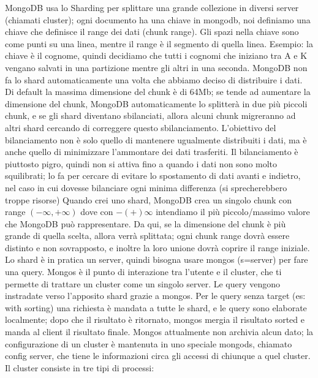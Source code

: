 \documentclass[a4page, 11pt]{article}
\begin{document}
MongoDB usa lo Sharding per splittare una grande collezione in diversi server (chiamati cluster); ogni documento ha una chiave in mongodb, noi definiamo una chiave che definisce il range dei dati (chunk range).
Gli spazi nella chiave sono come punti su una linea, mentre il range è il segmento di quella linea.
Esempio: la chiave è il cognome, quindi decidiamo che tutti i cognomi che iniziano tra A e K vengano salvati in una partizione mentre gli altri in una seconda.
MongoDB non fa lo shard automaticamente una volta che abbiamo deciso di distribuire i dati. 
Di default la massima dimensione del chunk è di 64Mb; se tende ad aumentare la dimensione del chunk, MongoDB automaticamente lo splitterà in due più piccoli chunk, e se gli shard diventano sbilanciati, allora alcuni chunk migreranno ad altri shard cercando di correggere questo sbilanciamento. 
L'obiettivo del bilanciamento non è solo quello di mantenere ugualmente distribuiti i dati, ma è anche quello di minimizzare l'ammontare dei dati trasferiti. 
Il bilanciamento è piuttosto pigro, quindi non si attiva fino a quando i dati non sono molto squilibrati; lo fa per cercare di
evitare lo spostamento di dati avanti e indietro, nel caso in cui dovesse bilanciare ogni minima differenza (si sprecherebbero troppe risorse)
\newline
Quando crei uno shard, MongoDB crea un singolo chunk con range $(-\infty, +\infty)$ dove con $-(+)\infty$ intendiamo il più piccolo/massimo valore che MongoDB può rappresentare. 
Da qui, se la dimensione del chunk è più grande di quella scelta, allora verrà splittata; ogni chunk range dovrà essere distinto e non sovrapposto, e inoltre la loro unione dovrà coprire il range iniziale.
\newline
Lo shard è in pratica un server, quindi bisogna usare mongos (s=server) per fare una query. Mongos è il punto di interazione tra l'utente e il cluster, che ti permette di trattare un cluster come un singolo server.
Le query vengono instradate verso l'apposito shard grazie a mongos. Per le query senza target (es: with sorting) una richiesta è mandata a tutte le shard, e le query sono elaborate localmente; dopo che il risultato è ritornato, mongos mergia il risultato sorted e manda al client il risultato finale.
Mongos attualmente non archivia alcun dato; la configurazione di un cluster è mantenuta in uno speciale mongods, chiamato config server, che tiene le informazioni circa gli accessi di chiunque a quel cluster.
\newline
Il cluster consiste in tre tipi di processi:
\end{document}
